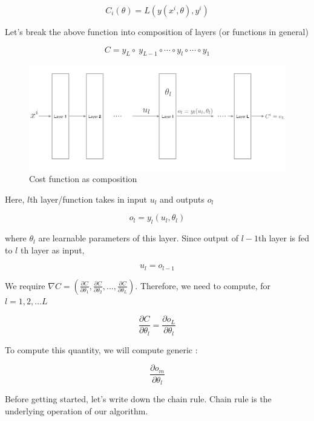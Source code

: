 \documentclass[a4paper]{tufte-handout}
\begin{document}
\[ C_i(\theta) = L\left(y(x^i, \theta), y^i \right)\]

Let's break the above function into composition of layers (or functions
in general)

\[ C = y_L \circ \ y_{L-1} \circ \cdots \circ y_l \circ \cdots \circ y_1 \]

\begin{figure}
  \includegraphics[width=\linewidth]{backprop.png}
  \caption{Cost function as composition}
\end{figure}


Here, \(l\)th  layer/function takes in input
\(u_l\) and outputs \(o_l\)

\begin{equation}
o_l = y_l(u_l, \theta_l) \label{eq:1}
\end{equation}


where \(\theta_l\) are learnable parameters of this layer. Since output
of \(l-1\)th layer is fed to \(l\) th layer as input,


\begin{equation}
u_l = o_{l-1} \label{eq:2}
\end{equation}


We require
\(\nabla C = \left(\frac{\partial C}{\partial\theta_1}, \frac{\partial C}{\partial\theta_2}, \ldots, \frac{\partial C}{\partial\theta_L}\right)\).
Therefore, we need to compute, for  \( l = 1, 2, \dots L \)

\[ \frac{\partial C}{\partial\theta_l} = \frac{\partial o_L}{\partial\theta_l} \]


To compute this quantity, we will compute generic
:

\[ \frac{\partial o_m}{\partial \theta_l} \]

Before getting started, let's write down the chain rule. Chain rule is
the underlying operation of our algorithm.
\end{document}
